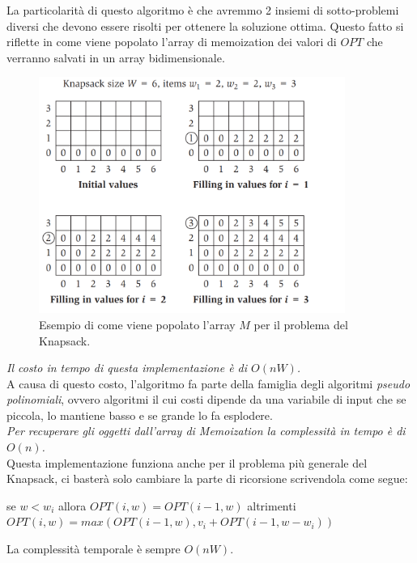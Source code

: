 La particolarità di questo algoritmo è che avremmo 2 insiemi di sotto-problemi
diversi che devono essere risolti per ottenere la soluzione ottima. Questo fatto
si riflette in come viene popolato l'array di memoization dei valori di $OPT$
che verranno salvati in un array bidimensionale.

\begin{figure}[H]
    \centering
    \includegraphics[width=10cm, keepaspectratio]{capitoli/dynamic_programming/imgs/knapsac_table.png}
    \caption{Esempio di come viene popolato l'array $M$ per il problema del Knapsack.}
\end{figure}

\textit{Il costo in tempo di questa implementazione è di $O(nW)$.}\\

A causa di questo costo, l'algoritmo fa parte della famiglia degli
algoritmi \textit{pseudo polinomiali}, ovvero algoritmi il cui costi dipende da
una variabile di input che se piccola, lo mantiene basso e se grande lo fa
esplodere.\\

\textit{Per recuperare gli oggetti dall'array di Memoization la complessità in tempo è di
    $O(n)$.}\\

Questa implementazione funziona anche per il problema più generale del Knapsack,
ci basterà solo cambiare la parte di ricorsione scrivendola come segue:

\begin{center}
    se $w < w_i$ allora $OPT(i, w) = OPT(i-1,w)$ altrimenti
    $OPT(i, w) = max(OPT(i-1, w), v_i + OPT(i-1, w-w_i))$
\end{center}

La complessità temporale è sempre $O(nW)$.